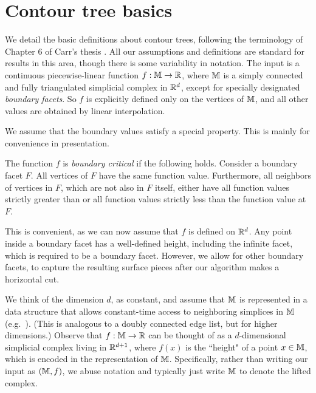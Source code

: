 \section{Contour tree basics} \label{sec:basics}

We detail the basic definitions about contour trees, following the terminology of Chapter 6 of Carr's thesis \cite{c-tmi-04}.
All our assumptions and definitions
are standard for results in this area, though there is some variability in notation.
The input is a continuous piecewise-linear function $f:\mathbb{M} \to \mathbb{R}$, where $\mathbb{M}$ is a simply connected and fully triangulated simplicial complex in $\mathbb{R}^d$,
except for specially designated \emph{boundary facets}. So $f$ is explicitly defined only on the vertices of $\mathbb{M}$,
and all other values are obtained by linear interpolation. 

We assume that the boundary values satisfy a special property. This is mainly for convenience
in presentation.

\begin{definition} \label{def:bound} The function $f$ is \emph{boundary critical} if the following holds.
Consider a boundary facet $F$. All vertices of $F$ have the same function value. Furthermore, all
neighbors of vertices in $F$, which are not also in $F$ itself, 
either have all function values strictly greater than or all function values strictly less than the function value at $F$.
\end{definition}

This is convenient, as we can now assume that $f$ is defined on $\mathbb{R}^d$. Any point inside a boundary facet
has a well-defined height, including the infinite facet, which is required to be a boundary facet.  However, 
we allow for other boundary facets, to capture the resulting surface pieces after our algorithm makes a horizontal cut. 

We think of the dimension $d$, as constant, and assume that $\mathbb{M}$ is represented in a data structure that allows constant-time access to neighboring simplices
in $\mathbb{M}$ (e.g.~\cite{BoMa12}). (This is analogous to a doubly connected edge list, but for higher dimensions.)
Observe that $f:\mathbb{M} \rightarrow \mathbb{R}$ can be thought of as a $d$-dimensional simplicial complex living in $\mathbb{R}^{d+1}$, 
where $f(x)$ is the ``height" of a point $x \in \mathbb{M}$, which is encoded in the representation of $\mathbb{M}$. 
Specifically, rather than writing our input as $(\mathbb{M},f)$, we abuse notation and typically just write $\mathbb{M}$ to denote the lifted complex.

